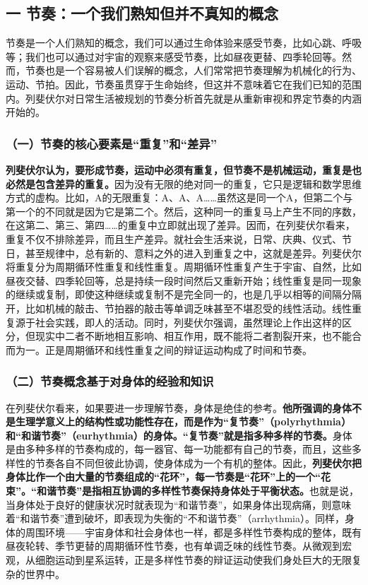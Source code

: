 \documentclass[UTF8, fontset = sourcesans, a4paper, oneside, zihao =
-4, scheme=chinese, no-math, space=true]{ctexbook}
\begin{document}
\subsection{一
节奏：一个我们熟知但并不真知的概念}\label{part0009_split_001.htmlux5cux23c046}

节奏是一个人们熟知的概念，我们可以通过生命体验来感受节奏，比如心跳、呼吸等；我们也可以通过对宇宙的观察来感受节奏，比如昼夜更替、四季轮回等。然而，节奏也是一个容易被人们误解的概念，人们常常把节奏理解为机械化的行为、运动、节拍。因此，节奏虽贯穿于生命始终，但这并不意味着它在我们已知的范围内。列斐伏尔对日常生活被规划的节奏分析首先就是从重新审视和界定节奏的内涵开始的。

\subsubsection{\texorpdfstring{（一）节奏的核心要素是``重复''和``差异''}{（一）节奏的核心要素是重复和差异}}\label{part0009_split_001.htmlux5cux23d023}

\textbf{列斐伏尔认为，要形成节奏，运动中必须有重复，但节奏不是机械运动，重复是也必然是包含差异的重复。}因为没有无限的绝对同一的重复，它只是逻辑和数学思维方式的虚构。比如，A的无限重复：A、A、A……虽然这是同一个A，但第二个与第一个的不同就是因为它是第二个。然后，这种同一的重复马上产生不同的序数，在这第二、第三、第四……的重复中立即就出现了差异。因而，在列斐伏尔看来，重复不仅不排除差异，而且生产差异。就社会生活来说，日常、庆典、仪式、节日，甚至规律中，总有新的、意料之外的进入到重复之中，这就是差异。列斐伏尔将重复分为周期循环性重复和线性重复。周期循环性重复产生于宇宙、自然，比如昼夜交替、四季轮回等，总是持续一段时间然后又重新开始；线性重复是同一现象的继续或复制，即使这种继续或复制不是完全同一的，也是几乎以相等的间隔分隔开，比如机械的敲击、节拍器的敲击等单调乏味甚至不堪忍受的线性活动。线性重复源于社会实践，即人的活动。同时，列斐伏尔强调，虽然理论上作出这样的区分，但现实中二者不断地相互影响、相互作用，既不能将二者割裂开来，也不能合而为一。正是周期循环和线性重复之间的辩证运动构成了时间和节奏。

\subsubsection{（二）节奏概念基于对身体的经验和知识}\label{part0009_split_001.htmlux5cux23d024}

在列斐伏尔看来，如果要进一步理解节奏，身体是绝佳的参考。\textbf{他所强调的身体不是生理学意义上的结构性或功能性存在，而是作为``复节奏''（polyrhythmia）和``和谐节奏''（eurhythmia）的身体。``复节奏''就是指多种多样的节奏。}身体是由多种多样的节奏构成的，每一器官、每一功能都有自己的节奏，而且，这些多样性的节奏各自不同但彼此协调，使身体成为一个有机的整体。因此，\textbf{列斐伏尔把身体比作一个由大量的节奏组成的``花环''，每一节奏是``花环''上的一个``花束''。``和谐节奏''是指相互协调的多样性节奏保持身体处于平衡状态。}也就是说，当身体处于良好的健康状况时就表现为``和谐节奏''，如果身体出现病痛，则意味着``和谐节奏''遭到破坏，即表现为失衡的``不和谐节奏''（arrhythmia）。同样，身体的周围环境------宇宙身体和社会身体也一样，都是多样性节奏构成的整体，既有昼夜轮转、季节更替的周期循环性节奏，也有单调乏味的线性节奏。从微观到宏观，从细胞运动到星系运转，正是多样性节奏的辩证运动使我们身处巨大的无限复杂的世界中。
\end{document}
